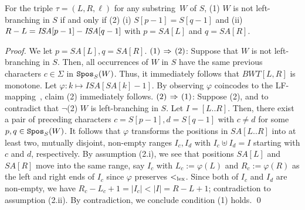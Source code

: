 \begin{lemma}\label{lem:leftmaximal:character}
For the triple $\tau = (L,R, \ell)$ for any substring~$W$ of $S$, 
(1) $W$ is not left-branching in $S$ if and only if  
(2) (i) $S[p-1] = S[q-1]$ and (ii) $R - L = \mathit{ISA}[p-1] - \mathit{ISA}[q-1]$ with $p = SA[L]$ and $q = SA[R]$.
\end{lemma}

\begin{proof}
We let $p = SA[L], q = SA[R]$. 
$(1)\mathbin{\,\Rightarrow\,} (2)$: Suppose that $W$ is not left-branching in $S$.
Then, all occurrences of $W$ in $S$ have the same previous characters $c \in \Sigma$ in $\mathtt{Spos}_{S}(W)$. Thus, it immediately follows that $BWT[L, R]$ is monotone.
Let $\varphi: k \mapsto ISA[SA[k]-1]$. By observing $\varphi$ coincodes to the LF-mapping~\cite{Ferragina05:FM}, claim (2) immediately follows. 
$(2) \mathbin{\,\Rightarrow\,} (1)$: 
Suppose (2), and to contradict that $\neg$(2) $W$ is left-branching in $S$. Let $I = [L..R]$. Then, there exist a pair of preceding characters $c = S[p-1], d=S[q-1]$ with $c\not= d$ for some $p, q \in \mathtt{Spos}_{S}(W)$. It follows that $\varphi$ transforms the positions in  $SA[L..R]$ into at least two, mutually disjoint, non-empty ranges $I_c, I_d$ with $I_c\uplus I_d = I$ starting with $c$ and $d$, respectively. By assumption (2.i), we see that positions $SA[L]$ and $SA[R]$ move into the same range, say $I_c$ with $L_c := \varphi(L)$ and $R_c := \varphi(R)$ as the left and right ends of $I_c$ since $\varphi$ preserves $<_{\mathrm{lex}}$. 
Since both of $I_c$ and $I_d$ are non-empty, we have $R_c - L_c + 1 = |I_c| < |I| = R - L + 1$; contradiction to assumption (2.ii). By contradiction, we conclude condition (1) holds. 
\qed   
\end{proof}


